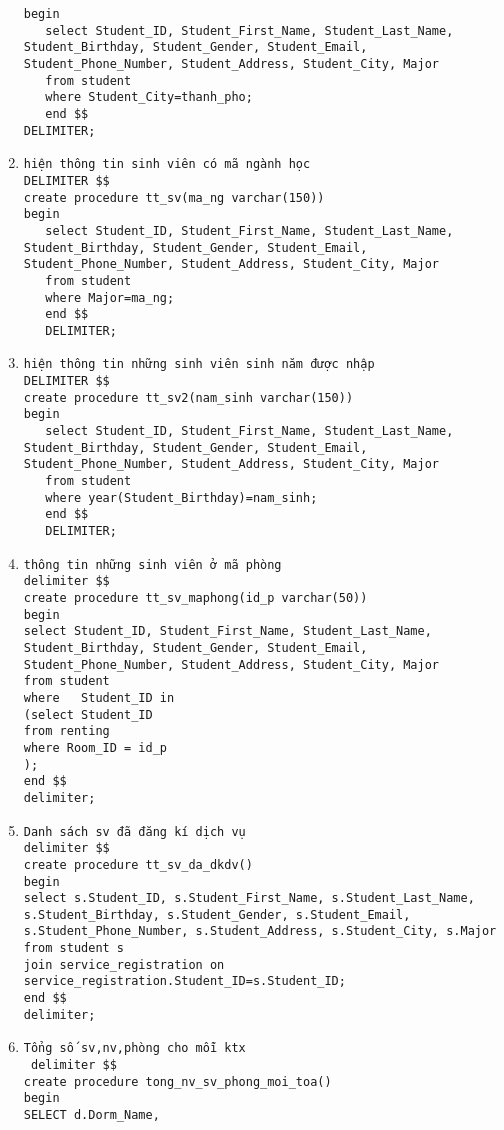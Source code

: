 \documentclass[a4paper,12pt]{article}
\begin{document}
\begin{enumerate}
\begin{verbatim}
begin
   select Student_ID, Student_First_Name, Student_Last_Name, Student_Birthday, Student_Gender, Student_Email, Student_Phone_Number, Student_Address, Student_City, Major
   from student 
   where Student_City=thanh_pho;
   end $$
DELIMITER;
\end{verbatim}
\item \begin{verbatim}
hiện thông tin sinh viên có mã ngành học
DELIMITER $$
create procedure tt_sv(ma_ng varchar(150))
begin
   select Student_ID, Student_First_Name, Student_Last_Name, Student_Birthday, Student_Gender, Student_Email, Student_Phone_Number, Student_Address, Student_City, Major
   from student 
   where Major=ma_ng;
   end $$
   DELIMITER;
\end{verbatim}
\item \begin{verbatim}
hiện thông tin những sinh viên sinh năm được nhập
DELIMITER $$
create procedure tt_sv2(nam_sinh varchar(150))
begin
   select Student_ID, Student_First_Name, Student_Last_Name, Student_Birthday, Student_Gender, Student_Email, Student_Phone_Number, Student_Address, Student_City, Major
   from student 
   where year(Student_Birthday)=nam_sinh;
   end $$
   DELIMITER;
\end{verbatim}
\item \begin{verbatim}
thông tin những sinh viên ở mã phòng 
delimiter $$
create procedure tt_sv_maphong(id_p varchar(50))
begin
select Student_ID, Student_First_Name, Student_Last_Name, Student_Birthday, Student_Gender, Student_Email, Student_Phone_Number, Student_Address, Student_City, Major
from student
where 	Student_ID in
(select Student_ID
from renting
where Room_ID = id_p
);
end $$
delimiter;
\end{verbatim}
\item \begin{verbatim}
Danh sách sv đã đăng kí dịch vụ
delimiter $$
create procedure tt_sv_da_dkdv()
begin
select s.Student_ID, s.Student_First_Name, s.Student_Last_Name, s.Student_Birthday, s.Student_Gender, s.Student_Email, s.Student_Phone_Number, s.Student_Address, s.Student_City, s.Major
from student s
join service_registration on service_registration.Student_ID=s.Student_ID;
end $$
delimiter;
\end{verbatim}
\item \begin{verbatim}
Tổng số sv,nv,phòng cho mỗi ktx
 delimiter $$
create procedure tong_nv_sv_phong_moi_toa()
begin
SELECT d.Dorm_Name,

\end{verbatim}
\end{enumerate}
\end{document}
